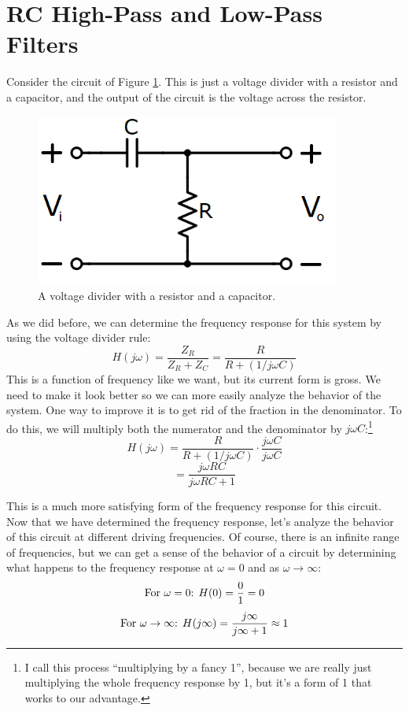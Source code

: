 \section{RC High-Pass and Low-Pass Filters}
Consider the circuit of Figure \ref{RC_HP}. This is just a voltage divider with a resistor and a capacitor, and the output of the circuit is the voltage across the resistor. 
\begin{figure}[h!]
\centering
\includegraphics[width=10cm]{figures/RC_HP.png}
\caption{A voltage divider with a resistor and a capacitor.}
\label{RC_HP}
\end{figure}
As we did before, we can determine the frequency response for this system by using the voltage divider rule:
$$
H(j\omega) = \frac{Z_R}{Z_R+Z_C} = \frac{R}{R+(1/j\omega C)}
$$
This is a function of frequency like we want, but its current form is gross. We need to make it look better so we can more easily analyze the behavior of the system. One way to improve it is to get rid of the fraction in the denominator. To do this, we will multiply both the numerator and the denominator by $j\omega C$:\footnote{I call this process ``multiplying by a fancy 1'', because we are really just multiplying the whole frequency response by 1, but it's a form of 1 that works to our advantage.}
$$
H(j\omega) = \frac{R}{R+(1/j\omega C)}\cdot\frac{j\omega C}{j\omega C}
$$
$$
= \frac{j\omega RC}{j\omega RC +1}
$$
\par
This is a much more satisfying form of the frequency response for this circuit. Now that we have determined the frequency response, let's analyze the behavior of this circuit at different driving frequencies. Of course, there is an infinite range of frequencies, but we can get a sense of the behavior of a circuit by determining what happens to the frequency response at $\omega=0$ and as $\omega\rightarrow\infty$:
$$
\textnormal{For }\omega=0\textnormal{: }H(0) = \frac{0}{1} = 0
$$
$$
\textnormal{For }\omega\rightarrow\infty\textnormal{: }H(j\infty) = \frac{j\infty}{j\infty+1} \approx 1
$$
